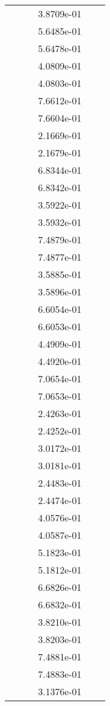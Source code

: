 \begin{xltabular}{\textwidth}{r|rS[table-format=1.3e+2]S[table-format=1.4e+2]S[table-format=1.4e+2]S[table-format=-1.5]}
&  &  & 3.8709e-01 & & \\
&  &  & 5.6485e-01 & & \\
&  &  & 5.6478e-01 & & \\
&  &  & 4.0809e-01 & & \\
&  &  & 4.0803e-01 & & \\
&  &  & 7.6612e-01 & & \\
&  &  & 7.6604e-01 & & \\
&  &  & 2.1669e-01 & & \\
&  &  & 2.1679e-01 & & \\
&  &  & 6.8344e-01 & & \\
&  &  & 6.8342e-01 & & \\
&  &  & 3.5922e-01 & & \\
&  &  & 3.5932e-01 & & \\
&  &  & 7.4879e-01 & & \\
&  &  & 7.4877e-01 & & \\
&  &  & 3.5885e-01 & & \\
&  &  & 3.5896e-01 & & \\
&  &  & 6.6054e-01 & & \\
&  &  & 6.6053e-01 & & \\
&  &  & 4.4909e-01 & & \\
&  &  & 4.4920e-01 & & \\
&  &  & 7.0654e-01 & & \\
&  &  & 7.0653e-01 & & \\
&  &  & 2.4263e-01 & & \\
&  &  & 2.4252e-01 & & \\
&  &  & 3.0172e-01 & & \\
&  &  & 3.0181e-01 & & \\
&  &  & 2.4483e-01 & & \\
&  &  & 2.4474e-01 & & \\
&  &  & 4.0576e-01 & & \\
&  &  & 4.0587e-01 & & \\
&  &  & 5.1823e-01 & & \\
&  &  & 5.1812e-01 & & \\
&  &  & 6.6826e-01 & & \\
&  &  & 6.6832e-01 & & \\
&  &  & 3.8210e-01 & & \\
&  &  & 3.8203e-01 & & \\
&  &  & 7.4881e-01 & & \\
&  &  & 7.4883e-01 & & \\
&  &  & 3.1376e-01 & & \\

\end{xltabular}
